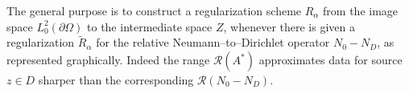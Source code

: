 \documentclass[10pt, a4paper, twoside, openright]{book}
\theoremstyle{definition}
\theoremstyle{plain}
\theoremstyle{plain}
\theoremstyle{plain}
\theoremstyle{plain}
\theoremstyle{plain}
\theoremstyle{plain}
\theoremstyle{plain}
\theoremstyle{plain}
\let\phi\varphi
\begin{document}
The general purpose is to construct a regularization scheme  $R_\alpha$ from the image space $L^2_0(\partial\Omega)$ to the intermediate space $Z$, whenever there is given a regularization $\tilde{R}_\alpha$ for the relative Neumann--to--Dirichlet operator ${N_0}-{N_D}$, as represented graphically. Indeed the range $\mathcal{R}(A^*)$ approximates data for source $z\in D$ sharper than the corresponding $\mathcal{R}({N_0} -{N_D})$.
\end{document}
